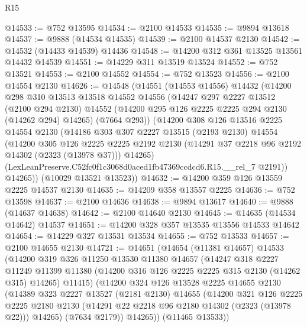\begin{lexlean}{R15}
\begin{coremodule}
@14533 := @752 @13595
@14534 := @2100 @14533
@14535 := @9894 @13618
@14537 := @9888 (@14534 @14535)
@14539 := @2100 @14537 @2130
@14542 := @14532 (@14433 @14539) @14436
@14548 := @14200 @312 @361 @13525 @13561 @14432 @14539
@14551 := @14229 @311 @13519 @13524
@14552 := @752 @13521
@14553 := @2100 @14552
@14554 := @752 @13523
@14556 := @2100 @14554 @2130
@14626 := @14548
    (@14551
      (@14553 @14556)
      @14432
      (@14200
        @298
        @310
        @13513
        @13518
        @14552
        @14556
        (@14247
          @297
          @2227
          @13512
          (@2100 @294 @2130)
          @14552
          (@14200 @295 @126 @2225 @2225 @294 @2130 (@14262 @294) @14265)
          (@7664 @293))
        (@14200
          @308
          @126
          @13516
          @2225
          @14554
          @2130
          (@14186
            @303
            @307
            @2227
            @13515
            (@2193 @2130)
            @14554
            (@14200
              @305
              @126
              @2225
              @2225
              @2192
              @2130
              (@14291 @37 @2218 @96 @2192 @14302 (@2323 (@13978 @37)))
              @14265)
            (LexLeanPreserve.C52fc0f1c3068d0aced1fb47369ccdcd6.R15.__rel_7 @2191))
          @14265))
      (@10029 @13521 @13523))
@14632 := @14200 @359 @126 @13559 @2225 @14537 @2130
@14635 := @14209 @358 @13557 @2225
@14636 := @752 @13598
@14637 := @2100 @14636
@14638 := @9894 @13617
@14640 := @9888 (@14637 @14638)
@14642 := @2100 @14640 @2130
@14645 := @14635 (@14534 @14642) @14537
@14651 := @14200 @328 @357 @13535 @13556 @14533 @14642
@14654 := @14229 @327 @13531 @13534
@14655 := @752 @13533
@14657 := @2100 @14655 @2130
@14721 := @14651
    (@14654
      (@11381 @14657)
      @14533
      (@14200
        @319
        @326
        @11250
        @13530
        @11380
        @14657
        (@14247
          @318
          @2227
          @11249
          @11399
          @11380
          (@14200 @316 @126 @2225 @2225 @315 @2130 (@14262 @315) @14265)
          @11415)
        (@14200
          @324
          @126
          @13528
          @2225
          @14655
          @2130
          (@14389
            @323
            @2227
            @13527
            (@2181 @2130)
            @14655
            (@14200
              @321
              @126
              @2225
              @2225
              @2180
              @2130
              (@14291 @22 @2218 @96 @2180 @14302 (@2323 (@13978 @22)))
              @14265)
            (@7634 @2179))
          @14265))
      (@11465 @13533))

\end{coremodule}
\end{lexlean}
